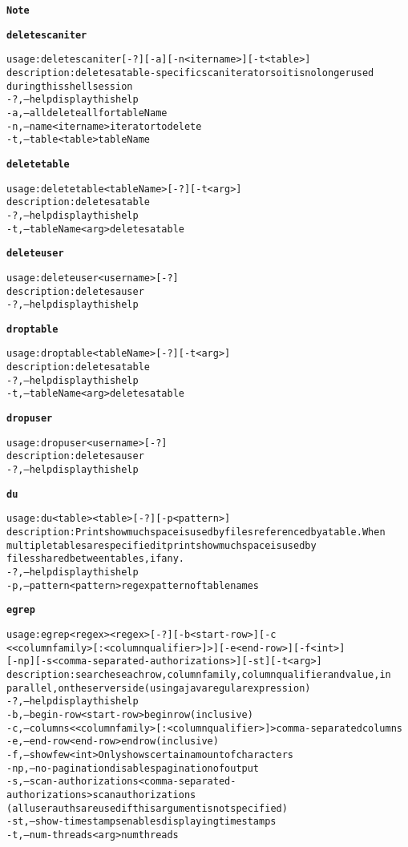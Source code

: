 \begin{alltt}
\textbf{Note}


\textbf{deletescaniter}

    usage: deletescaniter [-?] [-a] [-n <itername>] [-t <table>]
    description: deletes a table-specific scan iterator so it is no longer used
    	      during this shell session
      -?,--help  display this help
      -a,--all  delete all for tableName
      -n,--name <itername>	iterator to delete
      -t,--table <table>  tableName

\textbf{deletetable}

    usage: deletetable <tableName> [-?] [-t <arg>]
    description: deletes a table
      -?,--help  display this help
      -t,--tableName <arg>	deletes a table

\textbf{deleteuser}

    usage: deleteuser <username> [-?]
    description: deletes a user
      -?,--help  display this help

\textbf{droptable}

    usage: droptable <tableName> [-?] [-t <arg>]
    description: deletes a table
      -?,--help  display this help
      -t,--tableName <arg>	deletes a table

\textbf{dropuser}

    usage: dropuser <username> [-?]
    description: deletes a user
      -?,--help  display this help

\textbf{du}

    usage: du <table>{ <table>} [-?] [-p <pattern>]
    description: Prints how much space is used by files referenced by a table.  When
    	      multiple tables are specified it prints how much space is used by
    	      files shared between tables, if any.
      -?,--help  display this help
      -p,--pattern <pattern>  regex pattern of table names

\textbf{egrep}

    usage: egrep <regex>{ <regex>} [-?] [-b <start-row>] [-c
    	      <{<columnfamily>[:<columnqualifier>]}>] [-e <end-row>] [-f <int>]
    	      [-np] [-s <comma-separated-authorizations>] [-st] [-t <arg>]
    description: searches each row, column family, column qualifier and value, in
    	      parallel, on the server side (using a java regular expression)
      -?,--help  display this help
      -b,--begin-row <start-row>  begin row (inclusive)
      -c,--columns <{<columnfamily>[:<columnqualifier>]}>  comma-separated columns
      -e,--end-row <end-row>  end row (inclusive)
      -f,--show few <int>  Only shows certain amount of characters
      -np,--no-pagination  disables pagination of output
      -s,--scan-authorizations <comma-separated-authorizations>  scan authorizations
    	      (all user auths are used if this argument is not specified)
      -st,--show-timestamps  enables displaying timestamps
      -t,--num-threads <arg>  num threads


\end{alltt}

